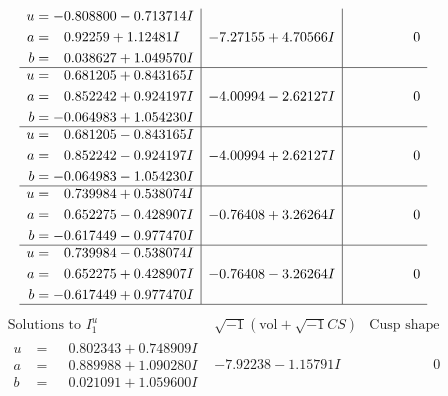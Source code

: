 \documentclass[1p]{elsarticle_modified}
\theoremstyle{definition}
\newcommand{\I}{\sqrt{-1}}
\begin{document}
$$\begin{array}{c|c|c}
\begin{aligned}
u &= -0.808800 - 0.713714 I \\
a &= \phantom{-}0.92259 + 1.12481 I \\
b &= \phantom{-}0.038627 + 1.049570 I\end{aligned}
 & -7.27155 + 4.70566 I & \phantom{-0.000000 } 0 \\ \hline\begin{aligned}
u &= \phantom{-}0.681205 + 0.843165 I \\
a &= \phantom{-}0.852242 + 0.924197 I \\
b &= -0.064983 + 1.054230 I\end{aligned}
 & -4.00994 - 2.62127 I & \phantom{-0.000000 } 0 \\ \hline\begin{aligned}
u &= \phantom{-}0.681205 - 0.843165 I \\
a &= \phantom{-}0.852242 - 0.924197 I \\
b &= -0.064983 - 1.054230 I\end{aligned}
 & -4.00994 + 2.62127 I & \phantom{-0.000000 } 0 \\ \hline\begin{aligned}
u &= \phantom{-}0.739984 + 0.538074 I \\
a &= \phantom{-}0.652275 - 0.428907 I \\
b &= -0.617449 - 0.977470 I\end{aligned}
 & -0.76408 + 3.26264 I & \phantom{-0.000000 } 0 \\ \hline\begin{aligned}
u &= \phantom{-}0.739984 - 0.538074 I \\
a &= \phantom{-}0.652275 + 0.428907 I \\
b &= -0.617449 + 0.977470 I\end{aligned}
 & -0.76408 - 3.26264 I & \phantom{-0.000000 } 0\\
 \hline 
 \end{array}$$\newpage$$\begin{array}{c|c|c}  
\text{Solutions to }I^u_{1}& \I (\text{vol} + \sqrt{-1}CS) & \text{Cusp shape}\\
 \hline 
\begin{aligned}
u &= \phantom{-}0.802343 + 0.748909 I \\
a &= \phantom{-}0.889988 + 1.090280 I \\
b &= \phantom{-}0.021091 + 1.059600 I\end{aligned}
 & -7.92238 - 1.15791 I & \phantom{-0.000000 } 0 \\ \hline\begin{aligned}

\end{aligned}
\end{array}$$
\end{document}
